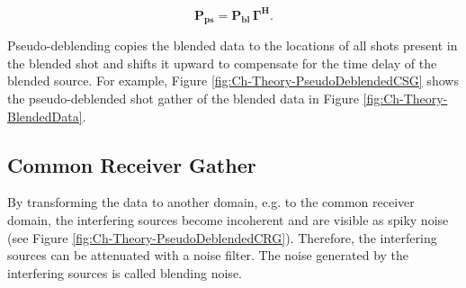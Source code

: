 \begin{equation}
	\mathbf{P_{ps}} = \mathbf{P_{bl}} \, \mathbf{\Gamma^H}.
	\label{eq:Ch-Theory-PseudoDeblended}
\end{equation}

Pseudo-deblending copies the blended data to the locations of all shots present in the blended shot and shifts it  upward to compensate for the time delay of the blended source. For example, Figure \ref{fig:Ch-Theory-PseudoDeblendedCSG} shows the pseudo-deblended shot gather of the blended data in Figure \ref{fig:Ch-Theory-BlendedData}.


\subsection{Common Receiver Gather}
By transforming the data to another domain, e.g. to the common receiver domain, the interfering sources become incoherent and are visible as spiky noise (see Figure \ref{fig:Ch-Theory-PseudoDeblendedCRG}). Therefore, the interfering sources can be attenuated with a noise filter. The noise generated by the interfering sources is called blending noise. 

